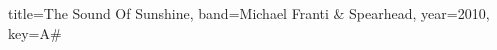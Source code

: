 \documentclass{skrul-leadsheet}
\begin{document}
\begin{song}[transpose-capo=true]{title={The Sound Of Sunshine}, band={Michael Franti \& Spearhead}, year={2010}, key={A#}}



\end{song}
\end{document}
